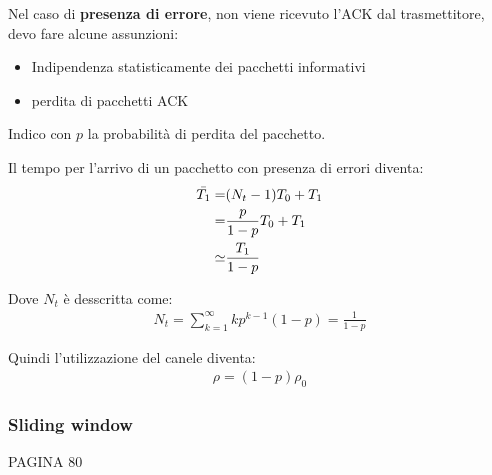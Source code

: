 Nel caso di \textbf{presenza di errore}, non viene ricevuto l'ACK dal trasmettitore, devo fare alcune assunzioni:
\begin{itemize}
	\item Indipendenza statisticamente dei pacchetti informativi
	\item perdita di pacchetti ACK
\end{itemize}

Indico con $p$ la probabilità di perdita del pacchetto.


Il tempo per l'arrivo di un pacchetto con presenza di errori diventa:
\begin{align}
	\Bar{T_1} = & (N_t - 1) T_0 + T_1     \\
	=           & \frac{p}{1-p} T_0 + T_1 \\
	\simeq      & \frac{T_1}{1-p}
\end{align}

Dove $N_t$ è desscritta come:
\begin{align}
	N_t = \sum_{k=1}^{\infty} k p^{k-1} (1-p) = \frac{1}{1-p}
\end{align}

Quindi l'utilizzazione del canele diventa:
\begin{align}
	\rho = (1 - p) \rho_0
\end{align}


\subsubsection{Sliding window}
PAGINA 80
